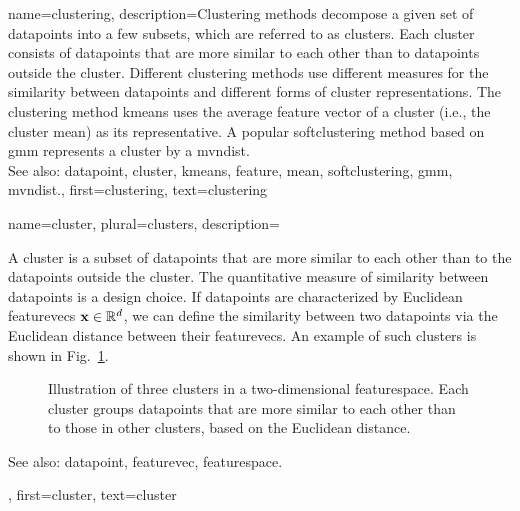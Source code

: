 {name={clustering}, 
	description={Clustering methods decompose a given 
		set of \glspl{datapoint} into a few subsets, which are referred to as \glspl{cluster}. 
		Each \gls{cluster} consists of \glspl{datapoint} that are more similar to each 
		other than to \glspl{datapoint} outside the \gls{cluster}. Different clustering methods 
		use different measures for the similarity between \glspl{datapoint} and different 
		forms of \gls{cluster} representations. The clustering method \gls{kmeans} uses the 
		average \gls{feature} vector of a \gls{cluster} (i.e., the \gls{cluster} \gls{mean}) as its representative. 
		A popular \gls{softclustering} method based on \gls{gmm} represents 
		a \gls{cluster} by a \gls{mvndist}.
				\\
		See also: \gls{datapoint}, \gls{cluster}, \gls{kmeans}, \gls{feature}, \gls{mean}, \gls{softclustering}, \gls{gmm}, \gls{mvndist}.},
	first={clustering},
	text={clustering} 
}
	
{name={cluster}, plural={clusters}, 
	description={A cluster is a subset of 
		\glspl{datapoint} that are more similar to each other than to the \glspl{datapoint} outside the cluster. 
		The quantitative measure of similarity between \glspl{datapoint} is a design choice. If \glspl{datapoint} 
		are characterized by Euclidean \glspl{featurevec} ${\bf x} \in \mathbb{R}^{d}$, 
		we can define the similarity between two \glspl{datapoint} via the Euclidean distance between 
		their \glspl{featurevec}. An example of such clusters is shown in Fig.~\ref{fig:clusters}.\\
		\begin{figure}[H]
		\centering
		\caption{Illustration of three clusters in a two-dimensional \gls{featurespace}. Each cluster groups \glspl{datapoint} that are more similar to each other than to those in other clusters, based on the Euclidean distance.}
		\label{fig:clusters}
		\end{figure}
		See also: \gls{datapoint}, \gls{featurevec}, \gls{featurespace}.},
	first={cluster},
	text={cluster} 
}


